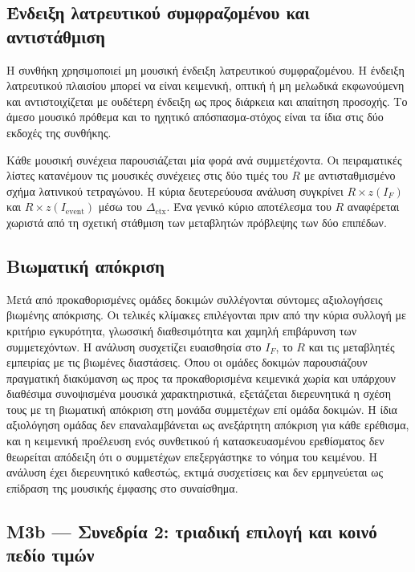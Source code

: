 \documentclass[11pt,a4paper]{article}
\begin{document}
\subsection{Ένδειξη λατρευτικού συμφραζομένου και αντιστάθμιση}\label{app:human-framing}

Η συνθήκη χρησιμοποιεί μη μουσική ένδειξη λατρευτικού συμφραζομένου. Η ένδειξη λατρευτικού πλαισίου μπορεί να είναι κειμενική, οπτική ή μη μελωδικά εκφωνούμενη και αντιστοιχίζεται με ουδέτερη ένδειξη ως προς διάρκεια και απαίτηση προσοχής. Το άμεσο μουσικό πρόθεμα και το ηχητικό απόσπασμα-στόχος είναι τα ίδια στις δύο εκδοχές της συνθήκης.

Κάθε μουσική συνέχεια παρουσιάζεται μία φορά ανά συμμετέχοντα. Οι πειραματικές λίστες κατανέμουν τις μουσικές συνέχειες στις δύο τιμές του $R$ με αντισταθμισμένο σχήμα λατινικού τετραγώνου. Η κύρια δευτερεύουσα ανάλυση συγκρίνει $R\times z(I_F)$ και $R\times z(I_{\mathrm{event}})$ μέσω του $\Delta_{\mathrm{ctx}}$. Ένα γενικό κύριο αποτέλεσμα του $R$ αναφέρεται χωριστά από τη σχετική στάθμιση των μεταβλητών πρόβλεψης των δύο επιπέδων.

\subsection{Βιωματική απόκριση}\label{app:human-affect}

Μετά από προκαθορισμένες ομάδες δοκιμών συλλέγονται σύντομες αξιολογήσεις βιωμένης απόκρισης. Οι τελικές κλίμακες επιλέγονται πριν από την κύρια συλλογή με κριτήριο εγκυρότητα, γλωσσική διαθεσιμότητα και χαμηλή επιβάρυνση των συμμετεχόντων. Η ανάλυση συσχετίζει ευαισθησία στο $I_F$, το $R$ και τις μεταβλητές εμπειρίας με τις βιωμένες διαστάσεις. Όπου οι ομάδες δοκιμών παρουσιάζουν πραγματική διακύμανση ως προς τα προκαθορισμένα κειμενικά χωρία και υπάρχουν διαθέσιμα συνοψισμένα μουσικά χαρακτηριστικά, εξετάζεται διερευνητικά η σχέση τους με τη βιωματική απόκριση στη μονάδα συμμετέχων επί ομάδα δοκιμών. Η ίδια αξιολόγηση ομάδας δεν επαναλαμβάνεται ως ανεξάρτητη απόκριση για κάθε ερέθισμα, και η κειμενική προέλευση ενός συνθετικού ή κατασκευασμένου ερεθίσματος δεν θεωρείται απόδειξη ότι ο συμμετέχων επεξεργάστηκε το νόημα του κειμένου. Η ανάλυση έχει διερευνητικό καθεστώς, εκτιμά συσχετίσεις και δεν ερμηνεύεται ως επίδραση της μουσικής έμφασης στο συναίσθημα.

\subsection{M3b — Συνεδρία 2: τριαδική επιλογή και κοινό πεδίο τιμών}\label{app:human-m3b-task}
\end{document}
